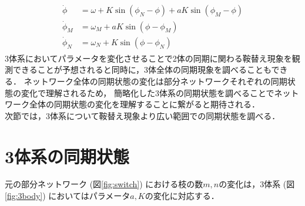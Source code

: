 \documentclass[../main]{subfiles}
\begin{document}
\begin{align}
    \label{eq:3body}
    \begin{split}
        \dot{\phi}&=\omega+K\sin\left( \phi_N-\phi \right)+aK\sin\left( \phi_M-\phi \right)\\
        \dot{\phi}_M&=\omega_M+aK\sin\left( \phi-\phi_M \right) \\
        \dot{\phi}_N&=\omega_N+K\sin\left( \phi-\phi_N \right)    
    \end{split}
\end{align}
3体系においてパラメータを変化させることで2体の同期に関わる鞍替え現象を観測できることが予想されると同時に，3体全体の同期現象を調べることもできる．
ネットワーク全体の同期状態の変化は部分ネットワークそれぞれの同期状態の変化で理解されるため，
簡略化した3体系の同期状態を調べることでネットワーク全体の同期状態の変化を理解することに繋がると期待される．\\
次節では，3体系について鞍替え現象より広い範囲での同期状態を調べる．
\section{3体系の同期状態}
元の部分ネットワーク (図\ref{fig:switch}) における枝の数$m,n$の変化は，3体系 (図\ref{fig:3body}) においてはパラメータ$a,K$の変化に対応する．
\end{document}
